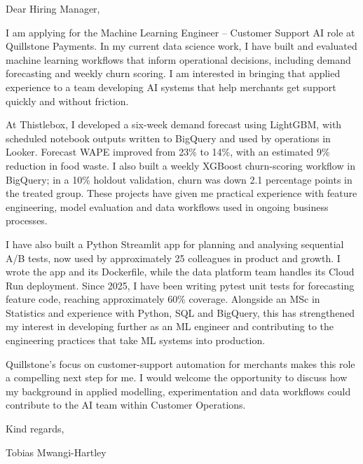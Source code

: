 \documentclass[11pt,a4paper]{article}
\begin{document}
Dear Hiring Manager,

I am applying for the Machine Learning Engineer – Customer Support AI role at Quillstone Payments. In my current data science work, I have built and evaluated machine learning workflows that inform operational decisions, including demand forecasting and weekly churn scoring. I am interested in bringing that applied experience to a team developing AI systems that help merchants get support quickly and without friction.

At Thistlebox, I developed a six-week demand forecast using LightGBM, with scheduled notebook outputs written to BigQuery and used by operations in Looker. Forecast WAPE improved from 23\% to 14\%, with an estimated 9\% reduction in food waste. I also built a weekly XGBoost churn-scoring workflow in BigQuery; in a 10\% holdout validation, churn was down 2.1 percentage points in the treated group. These projects have given me practical experience with feature engineering, model evaluation and data workflows used in ongoing business processes.

I have also built a Python Streamlit app for planning and analysing sequential A/B tests, now used by approximately 25 colleagues in product and growth. I wrote the app and its Dockerfile, while the data platform team handles its Cloud Run deployment. Since 2025, I have been writing pytest unit tests for forecasting feature code, reaching approximately 60\% coverage. Alongside an MSc in Statistics and experience with Python, SQL and BigQuery, this has strengthened my interest in developing further as an ML engineer and contributing to the engineering practices that take ML systems into production.

Quillstone’s focus on customer-support automation for merchants makes this role a compelling next step for me. I would welcome the opportunity to discuss how my background in applied modelling, experimentation and data workflows could contribute to the AI team within Customer Operations.

Kind regards,

Tobias Mwangi-Hartley
\end{document}
